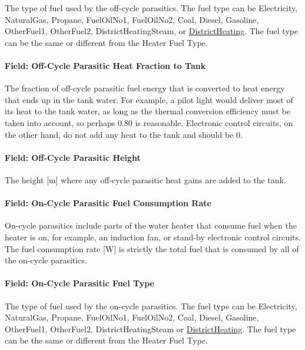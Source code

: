 The type of fuel used by the off-cycle parasitics. The fuel type can be Electricity, NaturalGas, Propane, FuelOilNo1, FuelOilNo2, Coal, Diesel, Gasoline, OtherFuel1, OtherFuel2, DistrictHeatingSteam, or \hyperref[districtheating]{DistrictHeating}. The fuel type can be the same or different from the Heater Fuel Type.

\paragraph{Field: Off-Cycle Parasitic Heat Fraction to Tank}\label{field-off-cycle-parasitic-heat-fraction-to-tank-1}

The fraction of off-cycle parasitic fuel energy that is converted to heat energy that ends up in the tank water. For example, a pilot light would deliver most of its heat to the tank water, as long as the thermal conversion efficiency must be taken into account, so perhaps 0.80 is reasonable. Electronic control circuits, on the other hand, do not add any heat to the tank and should be 0.

\paragraph{Field: Off-Cycle Parasitic Height}\label{field-off-cycle-parasitic-height}

The height {[}m{]} where any off-cycle parasitic heat gains are added to the tank.

\paragraph{Field: On-Cycle Parasitic Fuel Consumption Rate}\label{field-on-cycle-parasitic-fuel-consumption-rate-1}

On-cycle parasitics include parts of the water heater that consume fuel when the heater is on, for example, an induction fan, or stand-by electronic control circuits. The fuel consumption rate {[}W{]} is strictly the total fuel that is consumed by all of the on-cycle parasitics.

\paragraph{Field: On-Cycle Parasitic Fuel Type}\label{field-on-cycle-parasitic-fuel-type-1}

The type of fuel used by the on-cycle parasitics. The fuel type can be Electricity, NaturalGas, Propane, FuelOilNo1, FuelOilNo2, Coal, Diesel, Gasoline, OtherFuel1, OtherFuel2, DistrictHeatingSteam or \hyperref[districtheating]{DistrictHeating}. The fuel type can be the same or different from the Heater Fuel Type.

